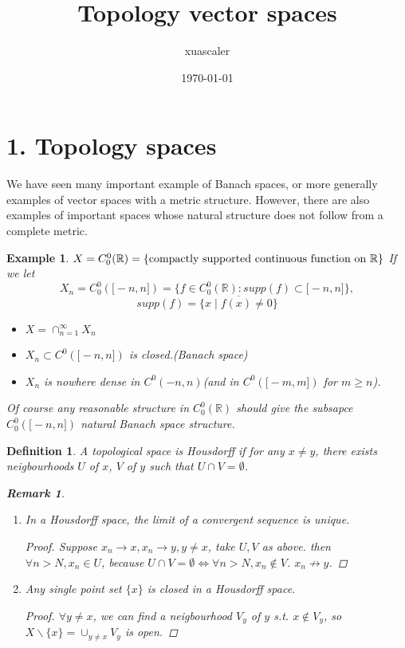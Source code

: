 \documentclass{article}
\title{Topology vector spaces}
\author{xuascaler}
\date{\today}
\newtheorem*{definition}{Definition}
\newtheorem*{remark}{Remark}
\newtheorem*{example}{Example}
\begin{document}
\maketitle

\section*{1. Topology spaces}
We have seen many important example of Banach spaces, 
or more generally examples of vector spaces with a metric structure.
However, there are also examples of important spaces 
whose natural structure does not follow from a complete metric.
\begin{example}
    $X = C_0^0(\mathbb{R}) = \{ \textnormal{compactly supported continuous function on } \mathbb{R}\}$
    If we let
    \[
        X_n = C_0^0(\bigl[-n, n \bigr]) = \{f \in C_0^0(\mathbb{R}): supp(f) \subset \bigl[ -n, n\bigr]\},
    \]
    \[
        supp(f)=\overline{\{x \mid f(x) \ne 0\}}
    \]
    \begin{itemize}
        \item $X = \cap_{n=1}^{\infty}{X_n}$
        \item $X_n \subset C^0(\bigl[-n, n\bigr])$ is closed.(Banach space)
        \item $X_n$ is nowhere dense in $C^0(-n, n)$(and in $C^0(\bigl[-m,m\bigr])$ for $m \ge n$).
    \end{itemize}
    Of course any reasonable structure in 
    $C_0^0(\mathbb{R})$ 
    should give the subsapce $C_0^0(\bigl[ -n, n \bigr])$ natural Banach space structure.
\end{example}
\begin{definition}
    A topological space is Housdorff if for any $x \ne y$, there exists neigbourhoods
    $U$ of $x$, $V$ of $y$ such that $U \cap V = \emptyset$.
    \begin{remark} \hfil
        \begin{enumerate}
            \item In a Housdorff space, the limit of a convergent sequence is unique.
            \begin{proof}
                Suppose $x_n \rightarrow x, x_n \rightarrow y, y \ne x$,
                take $U, V$ as above. then $\forall n > N, x_n \in U$,
                because $U \cap V = \emptyset \Leftrightarrow \forall n > N, x_n \not\in V$.
                $x_n \not\rightarrow y$.
            \end{proof}
            \item Any single point set $\{x\}$ is closed in a Housdorff space.
            \begin{proof}
                $\forall y \ne x$, we can find a neigbourhood $V_y$ of $y$ s.t. 
                $ x \not\in V_y$, so $X\backslash\{x\} = \cup_{y \ne x}{V_y}$ is open.
            \end{proof}
        \end{enumerate}
    \end{remark}
\end{definition}
\end{document}

